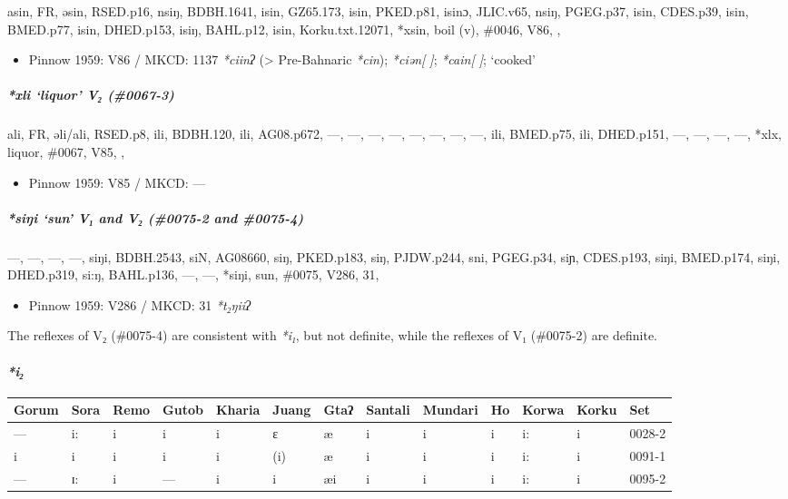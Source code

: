 \documentclass[a4paper,]{article}
\providecommand{\tightlist}{%
  \setlength{\itemsep}{0pt}\setlength{\parskip}{0pt}}
\let\oldparagraph\paragraph
\renewcommand{\paragraph}[1]{\oldparagraph{#1}\mbox{}}
\let\oldsubparagraph\subparagraph
\renewcommand{\subparagraph}[1]{\oldsubparagraph{#1}\mbox{}}
\begin{document}
asin, FR, əsin, RSED.p16, nsiŋ, BDBH.1641, isin, GZ65.173, isin,
PKED.p81, isinɔ, JLIC.v65, nsiŋ, PGEG.p37, isin, CDES.p39, isin,
BMED.p77, isin, DHED.p153, isiŋ, BAHL.p12, isin, Korku.txt.12071, *xsin,
boil (v), \#0046, V86, ,

\begin{itemize}
\tightlist
\item
  Pinnow 1959: V86 / MKCD: 1137 \emph{*ciinʔ} (\textgreater{}
  Pre-Bahnaric \emph{*cin}); \emph{*ciən{[} {]}}; \emph{*cain{[} {]}};
  `cooked'
\end{itemize}

\subparagraph{\texorpdfstring{\emph{*xli} `liquor' V₂
(\#0067-3)}{*xli liquor V₂ (\#0067-3)}}\label{xli-liquor-v-0067-3}

ali, FR, əli/ali, RSED.p8, ili, BDBH.120, ili, AG08.p672, ---, ---, ---,
---, ---, ---, ---, ---, ili, BMED.p75, ili, DHED.p151, ---, ---, ---,
---, *xlx, liquor, \#0067, V85, ,

\begin{itemize}
\tightlist
\item
  Pinnow 1959: V85 / MKCD: ---
\end{itemize}

\subparagraph{\texorpdfstring{\emph{*siŋi} `sun' V₁ and V₂ (\#0075-2 and
\#0075-4)}{*siŋi sun V₁ and V₂ (\#0075-2 and \#0075-4)}}\label{siux14bi-sun-v-and-v-0075-2-and-0075-4}

---, ---, ---, ---, siŋi, BDBH.2543, siN, AG08660, siŋ, PKED.p183, siŋ,
PJDW.p244, sni, PGEG.p34, siɲ, CDES.p193, siŋi, BMED.p174, siŋi,
DHED.p319, si:ŋ, BAHL.p136, ---, ---, *siŋi, sun, \#0075, V286, 31,

\begin{itemize}
\tightlist
\item
  Pinnow 1959: V286 / MKCD: 31 \emph{*t₂ŋiiʔ}
\end{itemize}

The reflexes of V₂ (\#0075-4) are consistent with \emph{*i₁}, but not
definite, while the reflexes of V₁ (\#0075-2) are definite.

\paragraph{\texorpdfstring{\emph{*i₂}}{*i₂}}\label{i-1}

\begin{longtable}[]{@{}lllllllllllll@{}}
\toprule
Gorum & Sora & Remo & Gutob & Kharia & Juang & Gtaʔ & Santali & Mundari
& Ho & Korwa & Korku & Set\tabularnewline
\midrule
\endhead
--- & i: & i & i & i & ɛ & æ & i & i & i & i: & i &
0028-2\tabularnewline
i & i & i & i & i & (i) & æ & i & i & i & i: & i & 0091-1\tabularnewline
--- & ɪ: & i & --- & i & i & æi & i & i & i & i: & i &
0095-2\tabularnewline
\bottomrule
\end{longtable}
\end{document}
